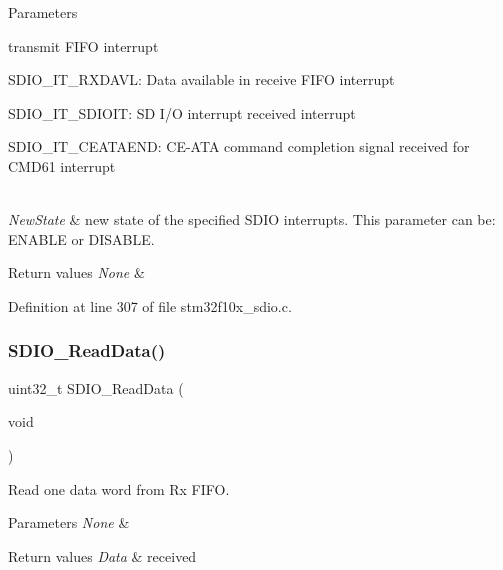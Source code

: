 \begin{DoxyParams}{Parameters}
\begin{DoxyItemize}
transmit F\+I\+FO interrupt \item S\+D\+I\+O\+\_\+\+I\+T\+\_\+\+R\+X\+D\+A\+VL\+: Data available in receive F\+I\+FO interrupt \item S\+D\+I\+O\+\_\+\+I\+T\+\_\+\+S\+D\+I\+O\+IT\+: SD I/O interrupt received interrupt \item S\+D\+I\+O\+\_\+\+I\+T\+\_\+\+C\+E\+A\+T\+A\+E\+ND\+: C\+E-\/\+A\+TA command completion signal received for C\+M\+D61 interrupt \end{DoxyItemize}
\\
\hline
{\em New\+State} & new state of the specified S\+D\+IO interrupts. This parameter can be\+: E\+N\+A\+B\+LE or D\+I\+S\+A\+B\+LE. \\
\hline
\end{DoxyParams}

\begin{DoxyRetVals}{Return values}
{\em None} & \\
\hline
\end{DoxyRetVals}


Definition at line 307 of file stm32f10x\+\_\+sdio.\+c.

\mbox{\label{group___s_d_i_o___private___functions_ga4e8ac755ef3c31ecd4ed2708df19187e}} 
\subsubsection{\texorpdfstring{S\+D\+I\+O\+\_\+\+Read\+Data()}{SDIO\_ReadData()}}
{\footnotesize\ttfamily uint32\+\_\+t S\+D\+I\+O\+\_\+\+Read\+Data (\begin{DoxyParamCaption}\item[{void}]{ }\end{DoxyParamCaption})}



Read one data word from Rx F\+I\+FO. 


\begin{DoxyParams}{Parameters}
{\em None} & \\
\hline
\end{DoxyParams}

\begin{DoxyRetVals}{Return values}
{\em Data} & received \\
\hline
\end{DoxyRetVals}


